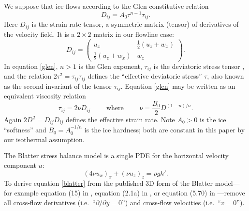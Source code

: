 \documentclass[11pt,final,reqno]{amsart}
\theoremstyle{remark}
\theoremstyle{definition}
\begin{document}
We suppose that ice flows according to the Glen constitutive relation \cite[equation (4.16)]{GreveBlatter2009}
\begin{equation}
  D_{ij} = A_0 \tau^{n-1} \tau_{ij}.  \label{glen}
\end{equation}
Here $D_{ij}$ is the strain rate tensor, a symmetric matrix (tensor) of derivatives of the velocity field.  It is a $2\times 2$ matrix in our flowline case:
	$$D_{ij}=\begin{pmatrix} u_x & \frac{1}{2}\left(u_z+w_x\right) \\
	                                     \frac{1}{2}\left(u_z+w_x\right) & w_z\end{pmatrix}.$$
In equation \eqref{glen}, $n > 1$ is the Glen exponent, $\tau_{ij}$ is the deviatoric stress tensor \cite{GreveBlatter2009}, and the relation $2 \tau^2 = \tau_{ij}\tau_{ij}$ defines the ``effective deviatoric stress'' $\tau$, also known as the second invariant of the tensor $\tau_{ij}$.  Equation \eqref{glen} may be written as an equivalent viscosity relation \cite[equation (4.22)]{GreveBlatter2009}
\begin{equation*}
  \tau_{ij} = 2 \nu D_{ij} \qquad \text{ where } \qquad \nu = \frac{B_0}{2} D^{(1-n)/n}.
\end{equation*}
Again $2 D^2 = D_{ij} D_{ij}$ defines the effective strain rate.  Note $A_0>0$ is the ice ``softness'' and $B_0=A_0^{-1/n}$ is the ice hardness; both are constant in this paper by our isothermal assumption.

The Blatter stress balance model is a single PDE for the horizontal velocity component $u$:
\begin{equation}
\left(4 \nu u_x\right)_x + \left(\nu u_z\right)_z = \rho g h'.\label{blatter}
\end{equation}
To derive equation \eqref{blatter} from the published 3D form of the Blatter model---for example equation (15) in \cite{Pattyn03}, equation (2.1a) in \cite{SchoofCoulombBlatter}, or equation (5.70) in \cite{GreveBlatter2009}---remove all cross-flow derivatives (i.e.~``$\partial/\partial y=0$'') and cross-flow velocities (i.e.~``$v=0$'').
\end{document}
